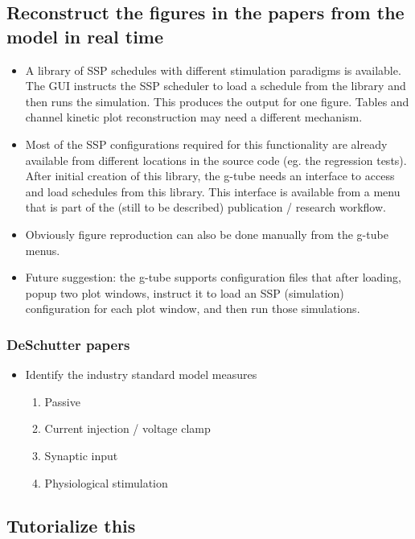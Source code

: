 \documentclass[12pt]{article}
\begin{document}
\subsection{Reconstruct the figures in the papers from the model in real time}
\begin{itemize}
\item A library of SSP schedules with different stimulation paradigms
  is available.  The GUI instructs the SSP scheduler to load a
  schedule from the library and then runs the simulation.  This
  produces the output for one figure.  Tables and channel kinetic plot
  reconstruction may need a different mechanism.
\item Most of the SSP configurations required for this functionality
  are already available from different locations in the source code
  (eg. the regression tests).  After initial creation of this library,
  the g-tube needs an interface to access and load schedules from this
  library.  This interface is available from a menu that is part of
  the (still to be described) publication / research workflow.
\item Obviously figure reproduction can also be done manually from the
  g-tube menus.
\item Future suggestion: the g-tube supports configuration files that
  after loading, popup two plot windows, instruct it to load an SSP
  (simulation) configuration for each plot window, and then run those
  simulations.
\end{itemize}


\subsubsection{DeSchutter papers}
\begin{itemize}
\item Identify the industry standard model measures
  \begin{enumerate}
  \item Passive
  \item Current injection / voltage clamp
  \item Synaptic input
  \item Physiological stimulation
  \end{enumerate}
\end{itemize}

\subsection{Tutorialize this}
\end{document}

